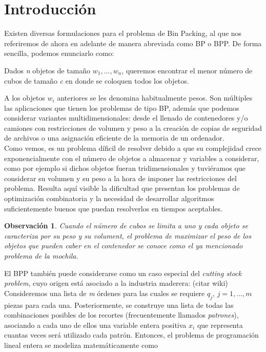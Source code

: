 \documentclass[a4paper, 12pt, oneside]{book}
\newtheorem{observacion}{Observaci\'on}[chapter]
\begin{document}
	\section{Introducci\'on}
	Existen diversas formulaciones para el problema de Bin Packing, al que nos referiremos de ahora en adelante de manera abreviada como BP o BPP. De forma sencilla, podemos enunciarlo como:
	
	\begin{center}
		Dados \textit{n} objetos de tama\~{n}o $w_{1},..., w_{n}$, queremos encontrar el menor n\'umero de cubos de tama\~{n}o \textit{c} en donde se coloquen todos los objetos.
	\end{center}
	
	A los objetos $w_{i}$ anteriores se les denomina habitualmente pesos. Son m\'ultiples las aplicaciones que tienen los problemas de tipo BP, adem\'as que podemos considerar variantes multidimensionales: desde el llenado de contenedores y/o camiones con restricciones de volumen y peso a la creaci\'on de copias de seguridad de archivos o una asignaci\'on eficiente de la memoria de un ordenador. 
	\\
	
	Como vemos, es un problema d\'ificil de resolver debido a que su complejidad crece exponencialmente con el n\'umero de objetos a almacenar y variables a considerar, como por ejemplo si dichos objetos fueran tridimensionales y tuvi\'eramos que considerar su volumen y su peso a la hora de imponer las restricciones del problema. Resulta aqu\'i visible la dificultad que presentan los problemas de optimizaci\'on combinatoria y la necesidad de desarrollar algoritmos suficientemente buenos que puedan resolverlos en tiempos aceptables.
	
	\begin{observacion}
		Cuando el n\'umero de cubos se limita a uno y cada objeto se caracteriza por su peso y su volument, el problema de maximizar el peso de los objetos que pueden caber en el contenedor se conoce como el  ya mencionado problema de la mochila.
	\end{observacion}
	
	El BPP tambi\'en puede considerarse como un caso especial del \textit{cutting stock problem}, cuyo origen est\'a asociado a la industria maderera: (citar wiki)
	\\
	
	Consideremos una lista de \textit{m} \'ordenes para las cuales se requiere $q_{j}$, $j = 1,...,m$ piezas para cada una. Posteriormente, se construye una lista de todas las combinaciones posibles de los recortes (frecuentemente llamados \textit{patrones}), asociando a cada uno de ellos una variable entera positiva $x_{i}$ que representa cuantas veces ser\'a utilizado cada patr\'on. Entonces, el problema de programaci\'on lineal entera se modeliza matem\'aticamente como
	\newpage
	
\end{document}
